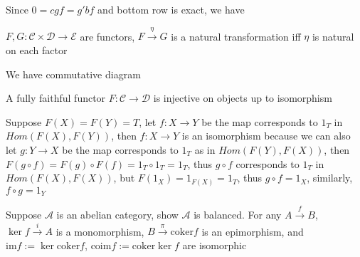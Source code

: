 \documentclass[main]{subfiles}
\begin{document}
\begin{solution}
Since $0=cgf=g'bf$ and bottom row is exact, we have
\begin{center}
\end{center}
\end{solution}

\begin{exercise}
$F,G:\mathscr C\times\mathscr D\to\mathscr E$ are functors, $F\xrightarrow{\eta} G$ is a natural transformation iff $\eta$ is natural on each factor
\end{exercise}

\begin{solution}
We have commutative diagram
\begin{center}
\end{center}
\end{solution}

\begin{exercise}\label{Fully faithfull functor is injective on objects up to isomorphism}
A fully faithful functor $F:\mathscr C\to\mathscr D$ is injective on objects up to isomorphism
\end{exercise}

\begin{solution}
Suppose $F(X)=F(Y)=T$, let $f:X\to Y$ be the map corresponds to $1_T$ in $Hom(F(X),F(Y))$, then $f:X\to Y$ is an isomorphism because we can also let $g:Y\to X$ be the map corresponds to $1_T$ as in $Hom(F(Y),F(X))$, then $F(g\circ f)=F(g)\circ F(f)=1_T\circ 1_T=1_T$, thus $g\circ f$ corresponds to $1_T$ in $Hom(F(X),F(X))$, but $F(1_X)=1_{F(X)}=1_T$, thus $g\circ f=1_X$, similarly, $f\circ g=1_Y$
\end{solution}

\begin{exercise}
Suppose $\mathscr A$ is an abelian category, show $\mathscr A$ is balanced. For any $A\xrightarrow{f}B$, $\ker f\xrightarrow{i}A$ is a monomorphism, $B\xrightarrow{\pi}\mathrm{coker}f$ is an epimorphism, and $\mathrm{im}f:=\ker\mathrm{coker}f$, $\mathrm{coim}f:=\mathrm{coker}\ker f$ are isomorphic
\end{exercise}
\end{document}

